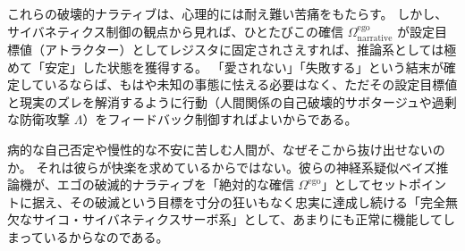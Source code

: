 これらの破壊的ナラティブは、心理的には耐え難い苦痛をもたらす。
しかし、サイバネティクス制御の観点から見れば、ひとたびこの確信 $\Omega^{\mathrm{ego}}_{\mathrm{narrative}}$ が設定目標値（アトラクター）としてレジスタに固定されさえすれば、推論系としては極めて「安定」した状態を獲得する。
「愛されない」「失敗する」という結末が確定しているならば、もはや未知の事態に怯える必要はなく、ただその設定目標値と現実のズレを解消するように行動（人間関係の自己破壊的サボタージュや過剰な防衛攻撃 $\Lambda$）をフィードバック制御すればよいからである。

病的な自己否定や慢性的な不安に苦しむ人間が、なぜそこから抜け出せないのか。
それは彼らが快楽を求めているからではない。彼らの神経系疑似ベイズ推論機が、エゴの破滅的ナラティブを「絶対的な確信 $\Omega^{\mathrm{ego}}$」としてセットポイントに据え、その破滅という目標を寸分の狂いもなく忠実に達成し続ける「完全無欠なサイコ・サイバネティクスサーボ系」として、あまりにも正常に機能してしまっているからなのである。


